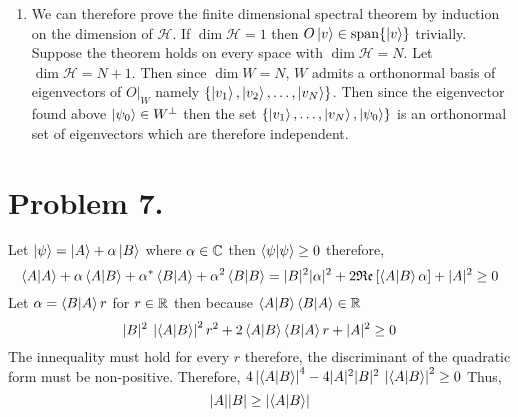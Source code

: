 \documentclass[12pt]{extarticle}
\begin{document}
\begin{enumerate}
\item We can therefore prove the finite dimensional spectral theorem by induction on the dimension of $\mathcal{H}$. If $\dim{\mathcal{H}} = 1$ then $O \left| v \right> \in \mathrm{span}\! \left\{\left| v \right> \right\}$ trivially. Suppose the theorem holds on every space with $\dim{\mathcal{H}} = N$. Let $\dim{\mathcal{H}} = N + 1$. Then since $\dim{W} = N$, $W$ admits a orthonormal basis of eigenvectors of $O|_W$ namely $\{\left| v_1 \right>, \left| v_2 \right>, \dots , \left| v_N \right> \}$. Then since the eigenvector found above $\left| \psi_0 \right> \in W^\perp$ then the set $\{\left| v_1 \right>, \dots, \left| v_N \right>, \left| \psi_0 \right> \}$ is an orthonormal set of eigenvectors which are therefore independent.  

\end{enumerate}

\section*{Problem 7.} Let $\left| \psi \right> = \left| A \right> + \alpha \left| B \right>$ where $\alpha \in \mathbb{C}$ then $\left< \psi | \psi \right> \ge 0$ therefore, \[\left< A | A \right> + \alpha \left< A | B \right> + \alpha^* \left< B | A \right> + \alpha^2 \left< B | B \right> = |B|^2 |\alpha|^2 + 2 \mathfrak{Re} \left[ \left< A | B \right> \alpha \right] + |A|^2 \ge 0 \]
Let $\alpha = \left< B | A \right> r$ for $r \in \mathbb{R}$ then because $\left< A | B \right> \left< B | A \right> \in \mathbb{R}$ \[ |B|^2  \:\left| \left< A | B \right> \right|^2 r^2 + 2  \left< A | B \right> \left< B | A \right> r + |A|^2 \ge 0 \]
The innequality must hold for every $r$ therefore, the discriminant of the quadratic form must be non-positive. Therefore, $4 \left| \left< A | B \right> \right|^4 - 4 |A|^2 |B|^2 \: \left| \left< A | B \right> \right|^2 \ge 0$ Thus, \[ |A||B| \ge \left| \left< A | B \right> \right| \]
\end{document}
